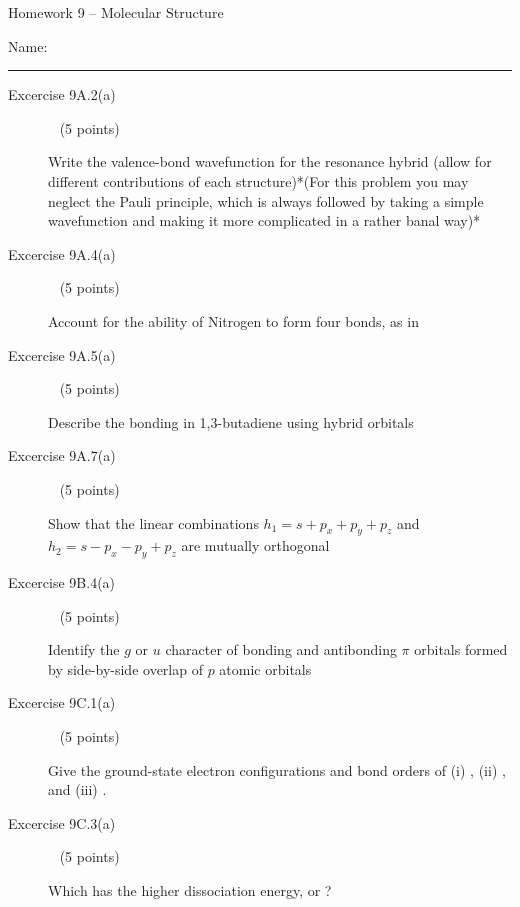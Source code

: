 \documentclass[10pt, letterpaper]{memoir}
\begin{document}
\begin{center}
	{\large Homework 9 -- Molecular Structure}
\end{center}

Name: \rule[-.1mm]{15em}{0.1pt}

\begin{description}
	\item [Excercise 9A.2(a)] ~ (5 points)
	
	Write the valence-bond wavefunction for the resonance hybrid  (allow for different contributions of each structure)*(For this problem you may neglect the Pauli principle, which is always followed by taking a simple wavefunction and making it more complicated in a rather banal way)*
	
	
	\vspace{9em}
	\item [Excercise 9A.4(a)] ~ (5 points)
	
	Account for the ability of Nitrogen to form four bonds, as in 
	
	\vspace{9em}
	\item [Excercise 9A.5(a)] ~ (5 points)
	
	Describe the bonding in 1,3-butadiene using hybrid orbitals
	
	\vspace{9em}
	\item [Excercise 9A.7(a)] ~ (5 points)
	
	Show that the linear combinations $h_1=s+p_x+p_y+p_z$ and $h_2=s-p_x-p_y+p_z$ are mutually orthogonal
	
	\vspace{15em}
	\item [Excercise 9B.4(a)] ~ (5 points)
	
	Identify the $g$ or $u$ character of bonding and antibonding $\pi$ orbitals formed by side-by-side overlap of $p$ atomic orbitals
	
	\vspace{10em}
	\item [Excercise 9C.1(a)] ~ (5 points)
	
	Give the ground-state electron configurations and bond orders of (i) , (ii) , and (iii) .
	
	\vspace{22em}
	\item [Excercise 9C.3(a)] ~ (5 points)
	
	Which has the higher dissociation energy,  or ?
	

\end{description}
\end{document}
